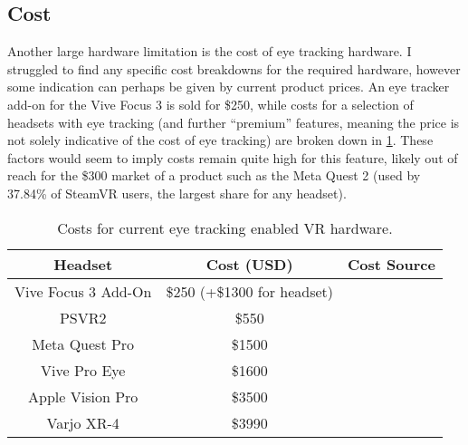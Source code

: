 \documentclass[a4paper,11pt]{article}
\begin{document}
\subsection{Cost}
\label{cost}
Another large hardware limitation is the cost of eye tracking hardware. I struggled to find any specific cost breakdowns for the required hardware, however some indication can perhaps be given by current product prices. An eye tracker add-on for the Vive Focus 3 is sold for \$250\cite{eye_cost_vive}, while costs for a selection of headsets with eye tracking (and further ``premium'' features, meaning the price is not solely indicative of the cost of eye tracking) are broken down in \cref{tab:costs}. These factors would seem to imply costs remain quite high for this feature, likely out of reach for the \$300\cite{quest_two_price} market of a product such as the Meta Quest 2 (used by 37.84\% of SteamVR users\cite{steam_hardware}, the largest share for any headset).
\begin{table}
  \begin{center}
    \begin{tabular}{|c|c|c|}
      \hline
      Headset & Cost (USD) & Cost Source\\
      \hline
      Vive Focus 3 Add-On & \$250 (+\$1300 for headset) & \cite{eye_cost_vive, focus_price}\\
      \hline
       PSVR2 & \$550 & \cite{psvr_price}\\
       \hline
       Meta Quest Pro & \$1500 & \cite{quest_pro_price}\\
       \hline
       Vive Pro Eye & \$1600 & \cite{vive_pro_eye}\\
       \hline
       Apple Vision Pro & \$3500 & \cite{vision_pro_price}\\
       \hline
       Varjo XR-4 & \$3990 & \cite{varjo_price}\\
       \hline
    \end{tabular}
  \end{center}
  \caption{Costs for current eye tracking enabled VR hardware.}
  \label{tab:costs}
\end{table}
\end{document}
